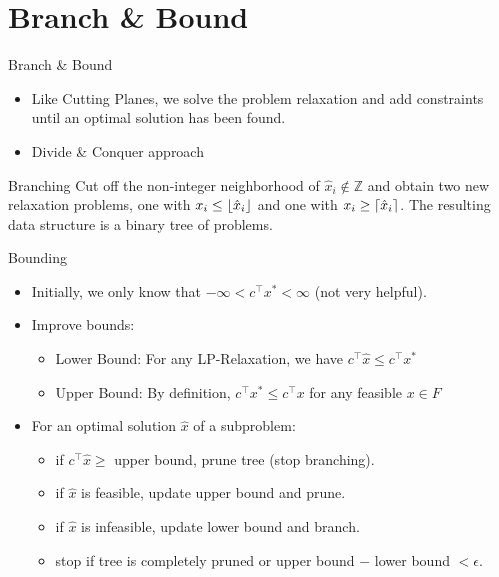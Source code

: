 \section{Branch \& Bound}

\begin{frame}{Branch \& Bound}
\begin{itemize}
\item Like Cutting Planes, we solve the problem relaxation and add constraints until an optimal solution has been found.
\item Divide \& Conquer approach
\end{itemize}
\end{frame}

\begin{frame}{Branching}
Cut off the non-integer neighborhood of $\hat{x}_i \notin \mathbb{Z}$ and obtain two new relaxation problems, one with $x_i \leq \lfloor\hat{x}_i\rfloor$ and one with $x_i \geq \lceil\hat{x}_i\rceil$. The resulting data structure is a binary tree of problems.

\begin{figure}[b]
\centering

\end{figure}

\end{frame}

\begin{frame}{Bounding}
\begin{itemize}
\item Initially, we only know that $-\infty < c^\top x^* < \infty$ (not very helpful).
\item Improve bounds:
\begin{itemize}
\item Lower Bound: For any LP-Relaxation, we have $c^\top \hat{x} \leq c^\top x^*$
\item Upper Bound: By definition, $c^\top x^* \leq c^\top x$ for any feasible $x \in F$
\end{itemize}
\item For an optimal solution $\hat{x}$ of a subproblem:
\begin{itemize}
\item if $c^\top \hat{x} \geq $ upper bound, prune tree (stop branching).
\item if $\hat{x}$ is feasible, update upper bound and prune.
\item if $\hat{x}$ is infeasible, update lower bound and branch.
\item stop if tree is completely pruned or upper bound $-$ lower bound $< \epsilon$.
\end{itemize}

\end{itemize}
\end{frame}

